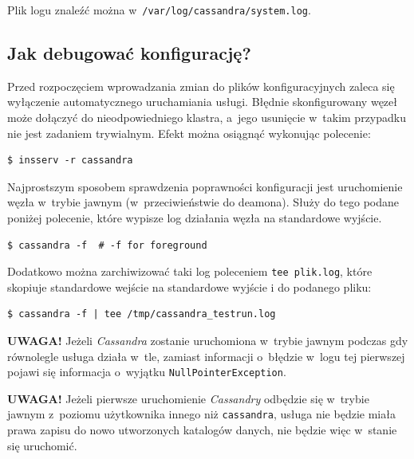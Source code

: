 \documentclass{article} %
\begin{document}
Plik logu znaleźć można w~\texttt{/var/log/cassandra/system.log}.

\subsection{Jak debugować konfigurację?}\label{subsec:config_debug}

Przed rozpoczęciem wprowadzania zmian do plików konfiguracyjnych zaleca się wyłączenie automatycznego uruchamiania usługi.
Błędnie skonfigurowany węzeł może dołączyć do nieodpowiedniego klastra, a~jego usunięcie w~takim przypadku nie jest zadaniem trywialnym.
Efekt można osiągnąć wykonując polecenie:

\begin{lstlisting}[style=bash, caption={wyłączenie uruchamiania \emph{Cassandry} na jej domyślnych runlevelach}]
$ insserv -r cassandra
\end{lstlisting}

Najprostszym sposobem sprawdzenia poprawności konfiguracji jest uruchomienie węzła w~trybie jawnym (w~przeciwieństwie do deamona).
Służy do tego podane poniżej polecenie, które wypisze log działania węzła na standardowe wyjście.

\begin{lstlisting}[style=bash, caption={testowe uruchamianie \emph{Cassandry}}]
$ cassandra -f  # -f for foreground
\end{lstlisting}

Dodatkowo można zarchiwizować taki log poleceniem \texttt{tee plik.log}, które skopiuje standardowe wejście na standardowe wyjście i do podanego pliku:

\begin{lstlisting}[style=bash, caption={testowe uruchamianie \emph{Cassandry} z archiwizacją logu}]
$ cassandra -f | tee /tmp/cassandra_testrun.log
\end{lstlisting}

\bigskip

\noindent\textbf{UWAGA!} Jeżeli \emph{Cassandra} zostanie uruchomiona w~trybie jawnym podczas gdy równolegle usługa działa w~tle, zamiast informacji o~błędzie w~logu tej pierwszej pojawi się informacja o~wyjątku \texttt{NullPointerException}.

\bigskip

\noindent\textbf{UWAGA!} Jeżeli pierwsze uruchomienie \emph{Cassandry} odbędzie się w~trybie jawnym z~poziomu użytkownika innego niż \texttt{cassandra}, usługa nie będzie miała prawa zapisu do nowo utworzonych katalogów danych, nie będzie więc w~stanie się uruchomić.
\end{document}
